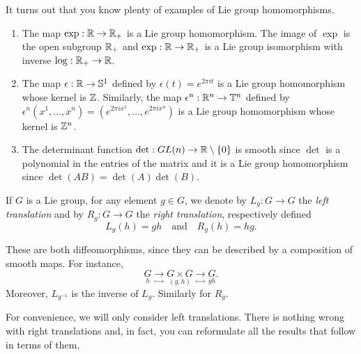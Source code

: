 \begin{example}
  It turns out that you know plenty of examples of Lie group homomorphisms.
  \begin{enumerate}
    \item The map $\exp:\mathbb{R}\to\mathbb{R}_+$ is a Lie group homomorphism. The image of $\exp$ is the open subgroup $\mathbb{R}_+$ and $\exp:\mathbb{R}\to\mathbb{R}_+$ is a Lie group isomorphism with inverse $\log:\mathbb{R}_+\to\mathbb{R}$.
    \item The map $\epsilon:\mathbb{R}\to\mathbb{S}^1$ defined by $\epsilon(t)=e^{2\pi i t}$ is a Lie group homomorphism whose kernel is $\mathbb{Z}$. Similarly, the map $\epsilon^n:\mathbb{R}^n\to\mathbb{T}^n$ defined by $\epsilon^n(x^1, \ldots, x^n)=(e^{2\pi i x^1}, \ldots, e^{2\pi i x^n})$ is a Lie group homomorphism whose kernel is $\mathbb{Z}^n$.
    \item The determinant function $\det:GL(n)\to\mathbb{R}\setminus\{0\}$ is smooth since $\det$ is a polynomial in the entries of the matrix and it is a Lie group homomorphism since $\det (AB) = \det(A) \det(B)$.
  \end{enumerate}
\end{example}

\begin{definition}
  If $G$ is a Lie group, for any element $g\in G$, we denote by $L_g:G\to G$ the \emph{left translation} and by $R_g:G\to G$ the \emph{right translation}, respectively defined
  \begin{equation}
    L_g(h) = gh
    \quad\mbox{and}\quad
    R_g(h) = hg.
  \end{equation}
\end{definition}

These are both diffeomorphisms, since they can be described by a composition of smooth maps. For instance,
\begin{equation}
  \underset{h}{G} \underset{\mapsto}{\to} \underset{(g,h)}{G\times G} \underset{\mapsto}{\to} \underset{gh}{G}.
\end{equation}
Moreover, $L_{g^{-1}}$ is the inverse of $L_g$.
Similarly for $R_g$.

\begin{remark}
  For convenience, we will only consider left translations.
  There is nothing wrong with right translations and, in fact, you can reformulate all the results that follow in terms of them.
\end{remark}

